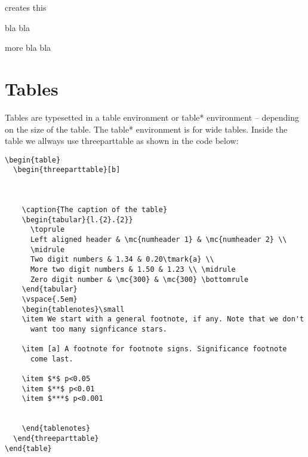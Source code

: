 creates this

\bce
\item bla bla
\item more bla bla
\ece

\section{Tables}

Tables are typesetted in a table environment or table* environment --
depending on the size of the table. The table* environment is for wide
tables. Inside the table we allways use threeparttable as shown in the
code below:

\begin{scriptsize}
\begin{verbatim}
\begin{table}
  \begin{threeparttable}[b]
  
  
  
    \caption{The caption of the table}
    \begin{tabular}{l.{2}.{2}}
      \toprule
      Left aligned header & \mc{numheader 1} & \mc{numheader 2} \\ 
      \midrule
      Two digit numbers & 1.34 & 0.20\tmark{a} \\
      More two digit numbers & 1.50 & 1.23 \\ \midrule
      Zero digit number & \mc{300} & \mc{300} \bottomrule
    \end{tabular}
    \vspace{.5em}
    \begin{tablenotes}\small
    \item We start with a general footnote, if any. Note that we don't
      want too many signficance stars.
      
    \item [a] A footnote for footnote signs. Significance footnote
      come last.
      
    \item $*$ p<0.05
    \item $**$ p<0.01
    \item $***$ p<0.001


    \end{tablenotes}
  \end{threeparttable}
\end{table}
\end{verbatim}
\end{scriptsize}

